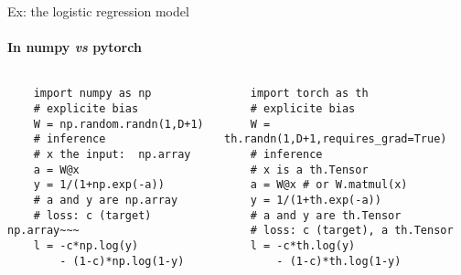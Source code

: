 \begin{frame}[fragile]{Ex: the logistic regression model}
  \framesubtitle{In numpy \textit{vs} pytorch}
  \begin{center}
  \end{center}
  \begin{columns}
    \small 
  \begin{verbatim}
    import numpy as np
    # explicite bias 
    W = np.random.randn(1,D+1) 
    # inference
    # x the input:  np.array
    a = W@x 
    y = 1/(1+np.exp(-a))
    # a and y are np.array
    # loss: c (target) np.array~~~
    l = -c*np.log(y)
        - (1-c)*np.log(1-y) 
  \end{verbatim}
  \begin{verbatim}
    import torch as th
    # explicite bias 
    W = th.randn(1,D+1,requires_grad=True)
    # inference
    # x is a th.Tensor 
    a = W@x # or W.matmul(x)
    y = 1/(1+th.exp(-a)) 
    # a and y are th.Tensor
    # loss: c (target), a th.Tensor
    l = -c*th.log(y)
        - (1-c)*th.log(1-y) 
  \end{verbatim}
\end{columns}
\end{frame}





